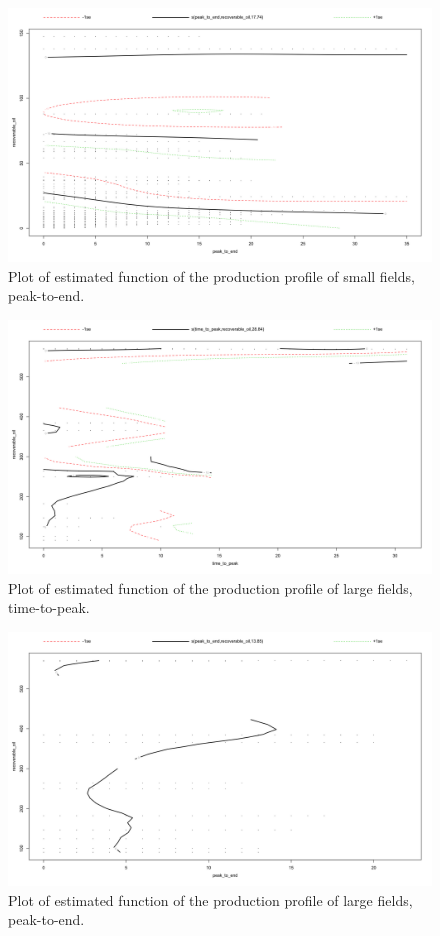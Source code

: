 \documentclass[12pt]{article}
\begin{document}
\begin{figure}
	\includegraphics[width=.8\textwidth]{figures/gam_under_2d_plot_2.png}
	\caption{Plot of estimated function of the production profile of small fields, peak-to-end.}
	\label{chart:gam_under_2d_plot_2}
\end{figure}

\begin{figure}
	\includegraphics[width=.8\textwidth]{figures/gam_over_2d_plot_1.png}
	\caption{Plot of estimated function of the production profile of large fields, time-to-peak.}
	\label{chart:gam_over_2d_plot_1}
\end{figure}

\begin{figure}
	\includegraphics[width=.8\textwidth]{figures/gam_over_2d_plot_2.png}
	\caption{Plot of estimated function of the production profile of large fields, peak-to-end.}
	\label{chart:gam_over_2d_plot_2}
\end{figure}
\end{document}
